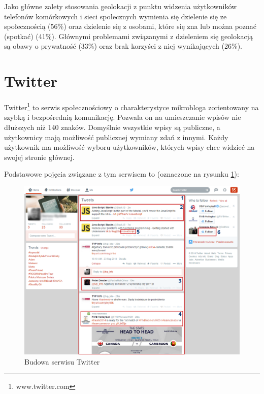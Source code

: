 Jako główne zalety stosowania geolokacji \cite{lostInGeolocation} z punktu
widzenia użytkowników telefonów komórkowych i sieci społecznych wymienia się
dzielenie się ze społecznością (56\%) oraz dzielenie się z osobami, które się 
zna lub można poznać (spotkać) (41\%). Głównymi problemami związanymi z 
dzieleniem się geolokacją są obawy o prywatność (33\%) oraz brak korzyści z niej
wynikających (26\%).



\clearpage\section{Twitter}
Twitter\footnote{www.twitter.com} to serwis społecznościowy o charakterystyce mikrobloga zorientowany
na szybką i bezpośrednią komunikację. Pozwala on
na umieszczanie wpisów nie dłuższych niż 140 znaków. Domyślnie wszystkie 
wpisy są publiczne, a użytkownicy mają możliwość publicznej wymiany zdań
z innymi. Każdy użytkownik ma możliwość wyboru użytkowników, których
wpisy chce widzieć na swojej stronie głównej.

Podstawowe pojęcia związane z tym serwisem to (oznaczone na rysunku \ref{image:twitter-screen}):

\begin{figure}[ht!]
\centering
\includegraphics[width=160mm]{img/twitter-screen2.png}
\caption{Budowa serwisu Twitter}
\label{image:twitter-screen}
\end{figure}

